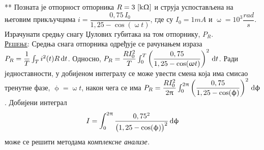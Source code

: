 \newpage\noindent
{\color{red}**}\PID
Позната је  отпорност отпорника $R = 3\,\left[\mathrm{k\Upomega}\right]$ и струја
успостављена на његовим прикључцима
$i = \dfrac{0,75\,I_0}{1,25 - \cos(\upomega t)}$,
где су $I_0 = 1\unit{mA}$ и $\upomega 
= 10^3\unit{\dfrac{rad}{s}}$. Израчунати средњу снагу Џулових губитака на том отпорнику, $P_R$.
\\[2mm]

\textsc{\underline{Решење}}:
Средња снага отпорника одређује се рачунањем израза
$P_R = \dfrac{1}{T}\int_{T} i^2(t) R \, {\rm d} t$. Односно,
$P_R = \dfrac{R I_0^2}{T}\int_0^T 
\left(
\dfrac{0,75}{1,25 - \cos(\upomega t)}
\right)^2
 \, {\rm d} t$. Ради једноставности, у добијеном интегралу
 се може увести смена која има смисао 
 тренутне фазе, $\upphi = \upomega t$, након чега 
се има
$P_R = \dfrac{R I_0^2}{2\uppi }\int_0^{2\uppi} 
\left(
\dfrac{0,75}{1,25 - \cos(\upphi)}
\right)^2
 \, {\rm d} \upphi$. Добијени интеграл 
\begin{equation}
I = \int_0^{2\uppi} 
\frac{0,75^2}{
\bigl(1,25 - \cos(\upphi)\bigr)^2
}
 \, {\rm d} \upphi \label{1}
\end{equation} 
 може се решити 
методама \textit{комплексне анализе.}

